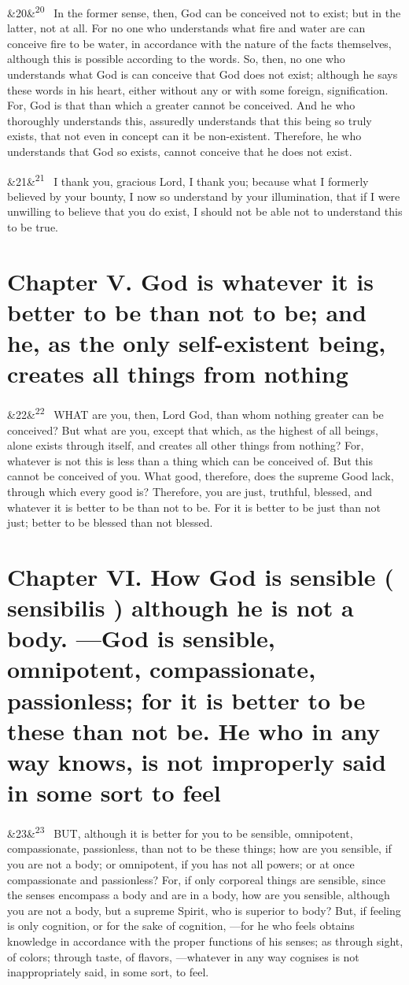 \documentclass[12pt]{article}
\newcommand{\para}[1][]{\par\noindent\ifx&#1&\else\textsuperscript{\footnotesize #1}~\fi}
\begin{document}
\para[20] In the former sense, then, God can be conceived not to exist; but in the latter, not at all. For no one who understands what fire and water are can conceive fire to be water, in accordance with the nature of the facts themselves, although this is possible according to the words. So, then, no one who understands what God is can conceive that God does not exist; although he says these words in his heart, either without any or with some foreign, signification. For, God is that than which a greater cannot be conceived. And he who thoroughly understands this, assuredly understands that this being so truly exists, that not even in concept can it be non-existent. Therefore, he who understands that God so exists, cannot conceive that he does not exist.

\para[21] I thank you, gracious Lord, I thank you; because what I formerly believed by your bounty, I now so understand by your illumination, that if I were unwilling to believe that you do exist, I should not be able not to understand this to be true.


\section*{Chapter V. God is whatever it is better to be than not to be; and he, as the only self-existent being, creates all things from nothing}

\para[22] WHAT are you, then, Lord God, than whom nothing greater can be conceived? But what are you, except that which, as the highest of all beings, alone exists through itself, and creates all other things from nothing? For, whatever is not this is less than a thing which can be conceived of. But this cannot be conceived of you. What good, therefore, does the supreme Good lack, through which every good is? Therefore, you are just, truthful, blessed, and whatever it is better to be than not to be. For it is better to be just than not just; better to be blessed than not blessed.


\section*{Chapter VI. How God is sensible ( sensibilis ) although he is not a body. ---God is sensible, omnipotent, compassionate, passionless; for it is better to be these than not be. He who in any way knows, is not improperly said in some sort to feel}

\para[23] BUT, although it is better for you to be sensible, omnipotent, compassionate, passionless, than not to be these things; how are you sensible, if you are not a body; or omnipotent, if you has not all powers; or at once compassionate and passionless? For, if only corporeal things are sensible, since the senses encompass a body and are in a body, how are you sensible, although you are not a body, but a supreme Spirit, who is superior to body? But, if feeling is only cognition, or for the sake of cognition, ---for he who feels obtains knowledge in accordance with the proper functions of his senses; as through sight, of colors; through taste, of flavors, ---whatever in any way cognises is not inappropriately said, in some sort, to feel.
\end{document}
